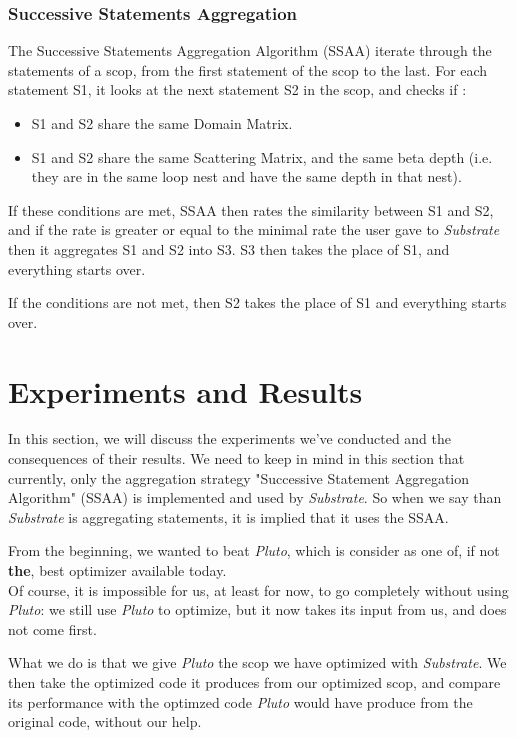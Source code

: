 \documentclass[paper=a4, fontsize=11.5pt]{scrartcl}
\numberwithin{equation}{section}        %
\numberwithin{figure}{section}          %
\numberwithin{table}{section}               %
\begin{document}
        \subsubsection{Successive Statements Aggregation}
            The Successive Statements Aggregation Algorithm (SSAA) iterate through
            the statements of a scop, from the first statement of the scop to the last.
            For each statement S1, it looks at the next statement S2 in the scop, and
            checks if :
            \begin{itemize}
                \item S1 and S2 share the same Domain Matrix.
                \item S1 and S2 share the same Scattering Matrix, and the same beta depth
                    (i.e. they are in the same loop nest and have the same depth in that nest).
            \end{itemize}
            If these conditions are met, SSAA then rates the similarity between S1 and S2,
            and if the rate is greater or equal to the minimal rate the user gave to \textit{Substrate}
            then it aggregates S1 and S2 into S3. S3 then takes the place of S1, and everything starts
            over.

            If the conditions are not met, then S2 takes the place of S1 and everything starts over.
            

\section{Experiments and Results}
In this section, we will discuss the experiments we've conducted and the consequences
of their results.
We need to keep in mind in this section that currently, only the aggregation strategy 
"Successive Statement Aggregation Algorithm" (SSAA) is implemented and used by \textit{Substrate}.
So when we say than \textit{Substrate} is aggregating statements, it is implied that it uses
the SSAA.

\bigskip

From the beginning, we wanted to beat \textit{Pluto}, which is consider as
one of, if not \textbf{the}, best optimizer available today.\\
Of course, it is impossible for us, at least for now, to go completely without using \textit{Pluto}:
we still use \textit{Pluto} to optimize, but it now takes its input from us, and does
not come first.

What we do is that we give \textit{Pluto} the scop we have optimized with \textit{Substrate}.
We then take the optimized code it produces from our optimized scop,
and compare its performance with the optimzed code \textit{Pluto} would have produce from
the original code, without our help.
\end{document}
